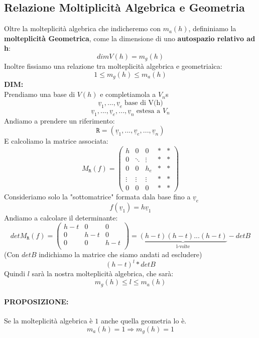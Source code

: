 \subsection{Relazione Moltiplicità Algebrica e Geometria}
Oltre la molteplicità algebrica che indicheremo con $m_a(h)$, defininiamo la \textbf{molteplicità Geometrica}, come la dimensione di uno \textbf{autospazio relativo ad h}:
$$ dimV(h) = m_g(h) $$
Inoltre fissiamo una relazione tra molteplicità algebrica e geometriaìca:
$$ 1 \le m_g(h) \le m_a(h) $$
\textbf{DIM:}\\
Prendiamo una base di $V(h)$ e completiamola a $V_n$s
$$ \underline{v}_1,...,\underline{v}_e \; \text{base di V(h)}$$
$$ \underline{v}_1,...,\underline{v}_e,...,\underline{v}_n \; \text{estesa a } V_n $$
Andiamo a prendere un riferimento:
$$\mathtt{R}=(\underline{v}_1,...,\underline{v}_e,...,\underline{v}_n)$$
E calcoliamo la matrice associata:
$$ M_{\mathtt{R}}(f) = 
\begin{pmatrix}
h & 0 & 0 & * & * \\
0 & \ddots & \vdots & * & * \\
0 & 0 & h_e & * & * \\
\vdots & \vdots & \vdots & * & * \\
0 & 0 & 0 & * & * 
\end{pmatrix}
$$
Consideriamo solo la "sottomatrice" formata dala base fino a $\underline{v}_e$
$$ f(\underline{v}_1) = h\underline{v}_1 $$
Andiamo a calcolare il determinante:
$$ det M_{\mathtt{R}}(f) = 
\begin{pmatrix}
h-t & 0 & 0\\
0 & h-t & 0 \\
0 & 0 & h-t \\
\end{pmatrix} = \underbrace{(h-t)(h-t)...(h-t)}_{\text{l-volte}}  - detB $$
(Con $det B$ indichiamo la matrice che siamo andati ad escludere)
$$ (h-t)^{l} * det B $$
Quindi $l$ sarà la nostra molteplicità algebrica, che sarà:
$$ m_g(h) \le l \le m_a(h) $$

\paragraph{PROPOSIZIONE:} Se la molteplicità algebrica è $1$ anche quella geometria lo è.
$$ m_a(h)=1 \Rightarrow m_g(h) = 1 $$

